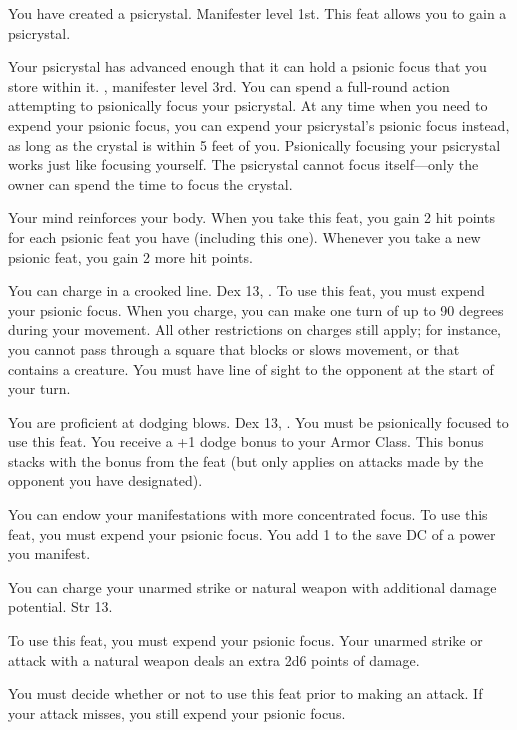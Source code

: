 {You have created a psicrystal.}
{Manifester level 1st.}
{This feat allows you to gain a psicrystal.}
{}{}

{Your psicrystal has advanced enough that it can hold a psionic focus that you store within it.}
{, manifester level 3rd.}
{You can spend a full-round action attempting to psionically focus your psicrystal. At any time when you need to expend your psionic focus, you can expend your psicrystal's psionic focus instead, as long as the crystal is within 5 feet of you. Psionically focusing your psicrystal works just like focusing yourself. The psicrystal cannot focus itself---only the owner can spend the time to focus the crystal.}
{}{}

{Your mind reinforces your body.}
{}
{When you take this feat, you gain 2 hit points for each psionic feat you have (including this one). Whenever you take a new psionic feat, you gain 2 more hit points.}
{}{}

{You can charge in a crooked line.}
{Dex 13, .}
{To use this feat, you must expend your psionic focus. When you charge, you can make one turn of up to 90 degrees during your movement. All other restrictions on charges still apply; for instance, you cannot pass through a square that blocks or slows movement, or that contains a creature. You must have line of sight to the opponent at the start of your turn.}
{}{}

{You are proficient at dodging blows.}
{Dex 13, .}
{You must be psionically focused to use this feat. You receive a +1 dodge bonus to your Armor Class. This bonus stacks with the bonus from the  feat (but only applies on attacks made by the opponent you have designated).}
{}{}

{You can endow your manifestations with more concentrated focus.}
{}
{To use this feat, you must expend your psionic focus. You add 1 to the save DC of a power you manifest.}
{}{}

{You can charge your unarmed strike or natural weapon with additional damage potential.}
{Str 13.}
{To use this feat, you must expend your psionic focus. Your unarmed strike or attack with a natural weapon deals an extra 2d6 points of damage.

You must decide whether or not to use this feat prior to making an attack. If your attack misses, you still expend your psionic focus.}
{}{}

